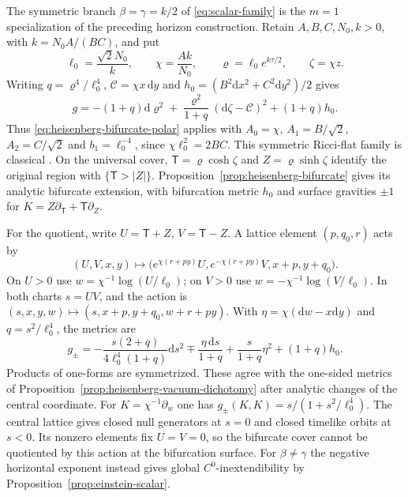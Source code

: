 \documentclass[10pt,a4paper]{article}
\numberwithin{equation}{section}
\theoremstyle{definition}
\theoremstyle{remark}
\newcommand{\dd}{\mathrm d}
\begin{document}
The symmetric branch $\beta=\gamma=k/2$ of
\eqref{eq:scalar-family} is the $m=1$ specialization of the preceding
horizon construction.  Retain $A,B,C,N_0,k>0$, with $k=N_0A/(BC)$,
and put
\begin{equation}
 \ell_0=\frac{\sqrt2N_0}{k},\qquad
 \chi=\frac{Ak}{N_0},\qquad
 \varrho=\ell_0e^{k\tau/2},\qquad \zeta=\chi z.
 \label{eq:taub-variables}
\end{equation}
Writing $q=\varrho^4/\ell_0^4$,
$\mathcal C=\chi x\,\dd y$ and
$h_0=(B^2\dd x^2+C^2\dd y^2)/2$ gives
\begin{equation}
 g=-(1+q)\dd\varrho^2
   +\frac{\varrho^2}{1+q}(\dd\zeta-\mathcal C)^2
   +(1+q)h_0.
 \label{eq:taub-rho}
\end{equation}
Thus \eqref{eq:heisenberg-bifurcate-polar} applies with
$A_0=\chi$, $A_1=B/\sqrt2$, $A_2=C/\sqrt2$ and
$b_1=\ell_0^{-4}$, since $\chi\ell_0^2=2BC$.
This symmetric Ricci-flat family is classical
\cite{Taub1951,ChristodoulakisEtAl2001}.
On the universal cover, $\mathsf T=\varrho\cosh\zeta$ and
$Z=\varrho\sinh\zeta$ identify the original region with
$\{\mathsf T>|Z|\}$.  Proposition~\ref{prop:heisenberg-bifurcate}
gives its analytic bifurcate extension, with bifurcation metric $h_0$
and surface gravities $\pm1$ for
$K=Z\partial_{\mathsf T}+\mathsf T\partial_Z$.

For the quotient, write $U=\mathsf T+Z$, $V=\mathsf T-Z$.
A lattice element $(p,q_0,r)$ acts by
\[
 (U,V,x,y)\longmapsto
 \bigl(e^{\chi(r+py)}U,e^{-\chi(r+py)}V,x+p,y+q_0\bigr).
\]
On $U>0$ use $w=\chi^{-1}\log(U/\ell_0)$; on $V>0$ use
$w=-\chi^{-1}\log(V/\ell_0)$.  In both charts $s=UV$, and the
action is $(s,x,y,w)\mapsto(s,x+p,y+q_0,w+r+py)$.
With $\eta=\chi(\dd w-x\dd y)$ and $q=s^2/\ell_0^4$, the metrics are
\begin{equation}
 g_\pm=-\frac{s(2+q)}{4\ell_0^4(1+q)}\dd s^2
       \mp\frac{\eta\,\dd s}{1+q}
       +\frac{s}{1+q}\eta^2+(1+q)h_0.
 \label{eq:compact-taub-metric}
\end{equation}
Products of one-forms are symmetrized.  These agree with the one-sided
metrics of Proposition~\ref{prop:heisenberg-vacuum-dichotomy} after
analytic changes of the central coordinate.  For
$K=\chi^{-1}\partial_w$ one has $g_\pm(K,K)=s/(1+s^2/\ell_0^4)$.
The central lattice gives closed null generators at $s=0$ and closed
timelike orbits at $s<0$.  Its nonzero elements fix $U=V=0$, so the
bifurcate cover cannot be quotiented by this action at the bifurcation
surface.  For $\beta\ne\gamma$ the negative horizontal exponent instead
gives global $C^0$-inextendibility by
Proposition~\ref{prop:einstein-scalar}.
\end{document}
